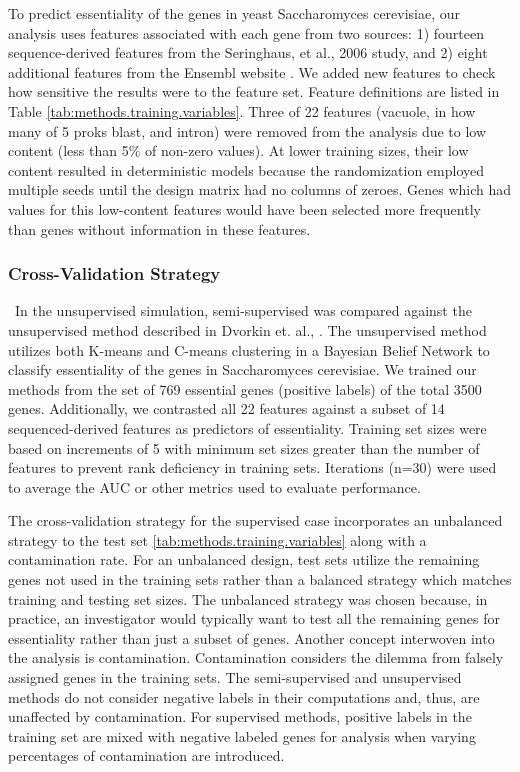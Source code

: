 \documentclass{bmcart}
\begin{document}
To predict essentiality of the genes in yeast Saccharomyces cerevisiae, our analysis uses features associated with each gene from two sources: 1) fourteen sequence-derived features from the Seringhaus, et al., 2006 study, and 2) eight additional features from the Ensembl website \citep{Ensembl2018}. We added new features to check how sensitive the results were to the feature set. Feature definitions are listed in Table \ref{tab:methods.training.variables}. Three of 22 features (vacuole, in how many of 5 proks blast, and intron) were removed from the analysis due to low content (less than 5\% of non-zero values). At lower training sizes, their low content resulted in deterministic models because the randomization employed multiple seeds until the design matrix had no columns of zeroes. Genes which had values for this low-content features would have been selected more frequently than genes without information in these features.

\subsubsection*{Cross-Validation Strategy}\label{subsubsection:cv}\
In the unsupervised simulation, semi-supervised was compared against the unsupervised method described in Dvorkin et. al., \citep{Dvorkin2013a}. The unsupervised method utilizes both K-means and C-means clustering in a Bayesian Belief Network to classify essentiality of the genes in Saccharomyces cerevisiae. We trained our methods from the set of 769 essential genes (positive labels) of the total 3500 genes. Additionally, we contrasted all 22 features against a subset of 14 sequenced-derived features as predictors of essentiality. Training set sizes were based on increments of 5 with minimum set sizes greater than the number of features to prevent rank deficiency in training sets. Iterations (n=30) were used to average the AUC or other metrics used to evaluate performance. 

The cross-validation strategy for the supervised case incorporates an unbalanced strategy to the test set \ref{tab:methods.training.variables} along with a contamination rate. For an unbalanced design, test sets utilize the remaining genes not used in the training sets rather than a balanced strategy which matches training and testing set sizes. The unbalanced strategy was chosen because, in practice, an investigator would typically want to test all the remaining genes for essentiality rather than just a subset of genes. Another concept interwoven into the analysis is contamination. Contamination considers the dilemma from falsely assigned genes in the training sets. The semi-supervised and unsupervised methods do not consider negative labels in their computations and, thus, are unaffected by contamination. For supervised methods, positive labels in the training set are mixed with negative labeled genes for analysis when varying percentages of contamination are introduced. 
\end{document}

